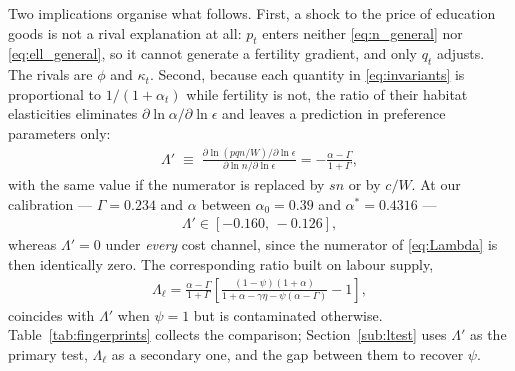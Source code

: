 \documentclass[11pt]{article}
\begin{document}
Two implications organise what follows. First, a shock to the price of education goods is not a
rival explanation at all: $p_t$ enters neither \eqref{eq:n_general} nor \eqref{eq:ell_general}, so
it cannot generate a fertility gradient, and only $q_t$ adjusts. The rivals are $\phi$ and
$\kappa_t$. Second, because each quantity in \eqref{eq:invariants} is proportional to
$1/(1+\alpha_t)$ while fertility is not, the ratio of their habitat elasticities eliminates
$\partial\ln\alpha/\partial\ln\epsilon$ and leaves a prediction in preference parameters only:
\begin{align}
\Lambda'\;\equiv\;
\frac{\partial\ln\left(pqn/W\right)/\partial\ln\epsilon}{\partial\ln n/\partial\ln\epsilon}
=-\frac{\alpha-\Gamma}{1+\Gamma},
\label{eq:Lambda}
\end{align}
with the same value if the numerator is replaced by $sn$ or by $c/W$. At our calibration ---
$\Gamma=0.234$ and $\alpha$ between $\alpha_0=0.39$ and $\alpha^\ast=0.4316$ ---
\begin{align}
\Lambda'\in[-0.160,\,-0.126],
\label{eq:Lambda_number}
\end{align}
whereas $\Lambda'=0$ under \emph{every} cost channel, since the numerator of \eqref{eq:Lambda} is
then identically zero. The corresponding ratio built on labour supply,
\begin{align}
\Lambda_\ell=\frac{\alpha-\Gamma}{1+\Gamma}
\left[\frac{(1-\psi)(1+\alpha)}{1+\alpha-\gamma\eta-\psi(\alpha-\Gamma)}-1\right],
\label{eq:Lambda_ell}
\end{align}
coincides with $\Lambda'$ when $\psi=1$ but is contaminated otherwise. Table~\ref{tab:fingerprints}
collects the comparison; Section~\ref{sub:ltest} uses $\Lambda'$ as the primary test,
$\Lambda_\ell$ as a secondary one, and the gap between them to recover $\psi$.
\end{document}
